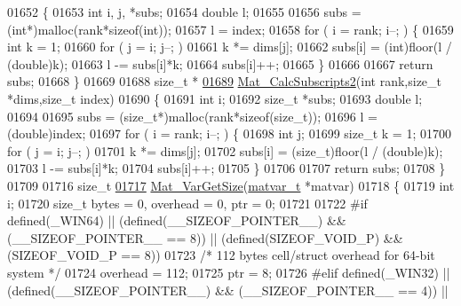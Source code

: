 \begin{DoxyCode}
{{{{{{{{{{{{{{{{{{{{{{{{{{{{{{01652 \{
01653     \textcolor{keywordtype}{int} i, j, *subs;
01654     \textcolor{keywordtype}{double} l;
01655 
01656     subs = (\textcolor{keywordtype}{int}*)malloc(rank*\textcolor{keyword}{sizeof}(\textcolor{keywordtype}{int}));
01657     l = index;
01658     \textcolor{keywordflow}{for} ( i = rank; i--; ) \{
01659         \textcolor{keywordtype}{int} k = 1;
01660         \textcolor{keywordflow}{for} ( j = i; j--; )
01661             k *= dims[j];
01662         subs[i] = (int)floor(l / (\textcolor{keywordtype}{double})k);
01663         l -= subs[i]*k;
01664         subs[i]++;
01665     \}
01666 
01667     \textcolor{keywordflow}{return} subs;
01668 \}
01669 
01688 \textcolor{keywordtype}{size\_t} *
\hyperlink{group___m_a_t_ga5af1727403cfa3daa8567de39e1abe64}{01689} \hyperlink{group___m_a_t_ga5af1727403cfa3daa8567de39e1abe64}{Mat\_CalcSubscripts2}(\textcolor{keywordtype}{int} rank,\textcolor{keywordtype}{size\_t} *dims,\textcolor{keywordtype}{size\_t} index)
01690 \{
01691     \textcolor{keywordtype}{int} i;
01692     \textcolor{keywordtype}{size\_t} *subs;
01693     \textcolor{keywordtype}{double} l;
01694 
01695     subs = (\textcolor{keywordtype}{size\_t}*)malloc(rank*\textcolor{keyword}{sizeof}(\textcolor{keywordtype}{size\_t}));
01696     l = (double)index;
01697     \textcolor{keywordflow}{for} ( i = rank; i--; ) \{
01698         \textcolor{keywordtype}{int} j;
01699         \textcolor{keywordtype}{size\_t} k = 1;
01700         \textcolor{keywordflow}{for} ( j = i; j--; )
01701             k *= dims[j];
01702         subs[i] = (size\_t)floor(l / (\textcolor{keywordtype}{double})k);
01703         l -= subs[i]*k;
01704         subs[i]++;
01705     \}
01706 
01707     \textcolor{keywordflow}{return} subs;
01708 \}
01709 
01716 \textcolor{keywordtype}{size\_t}
\hyperlink{group___m_a_t_gaeeb798fead2f765bddfb19016c7fdbcc}{01717} \hyperlink{group___m_a_t_gaeeb798fead2f765bddfb19016c7fdbcc}{Mat\_VarGetSize}(\hyperlink{group___m_a_t_structmatvar__t}{matvar\_t} *matvar)
01718 \{
01719     \textcolor{keywordtype}{int} i;
01720     \textcolor{keywordtype}{size\_t} bytes = 0, overhead = 0, ptr = 0;
01721 
01722 \textcolor{preprocessor}{#if defined(\_WIN64) || (defined(\_\_SIZEOF\_POINTER\_\_) && (\_\_SIZEOF\_POINTER\_\_ == 8)) ||
       (defined(SIZEOF\_VOID\_P) && (SIZEOF\_VOID\_P == 8))}
01723     \textcolor{comment}{/* 112 bytes cell/struct overhead for 64-bit system */}
01724     overhead = 112;
01725     ptr = 8;
01726 \textcolor{preprocessor}{#elif defined(\_WIN32) || (defined(\_\_SIZEOF\_POINTER\_\_) && (\_\_SIZEOF\_POINTER\_\_ == 4)) ||
}}}}}}}}}}}}}}}}}}}}}}}}}}}}}}}
\end{DoxyCode}

